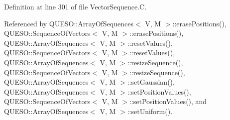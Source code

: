 Definition at line 301 of file Vector\-Sequence.\-C.



Referenced by Q\-U\-E\-S\-O\-::\-Array\-Of\-Sequences$<$ V, M $>$\-::erase\-Positions(), Q\-U\-E\-S\-O\-::\-Sequence\-Of\-Vectors$<$ V, M $>$\-::erase\-Positions(), Q\-U\-E\-S\-O\-::\-Array\-Of\-Sequences$<$ V, M $>$\-::reset\-Values(), Q\-U\-E\-S\-O\-::\-Sequence\-Of\-Vectors$<$ V, M $>$\-::reset\-Values(), Q\-U\-E\-S\-O\-::\-Array\-Of\-Sequences$<$ V, M $>$\-::resize\-Sequence(), Q\-U\-E\-S\-O\-::\-Sequence\-Of\-Vectors$<$ V, M $>$\-::resize\-Sequence(), Q\-U\-E\-S\-O\-::\-Array\-Of\-Sequences$<$ V, M $>$\-::set\-Gaussian(), Q\-U\-E\-S\-O\-::\-Array\-Of\-Sequences$<$ V, M $>$\-::set\-Position\-Values(), Q\-U\-E\-S\-O\-::\-Sequence\-Of\-Vectors$<$ V, M $>$\-::set\-Position\-Values(), and Q\-U\-E\-S\-O\-::\-Array\-Of\-Sequences$<$ V, M $>$\-::set\-Uniform().


